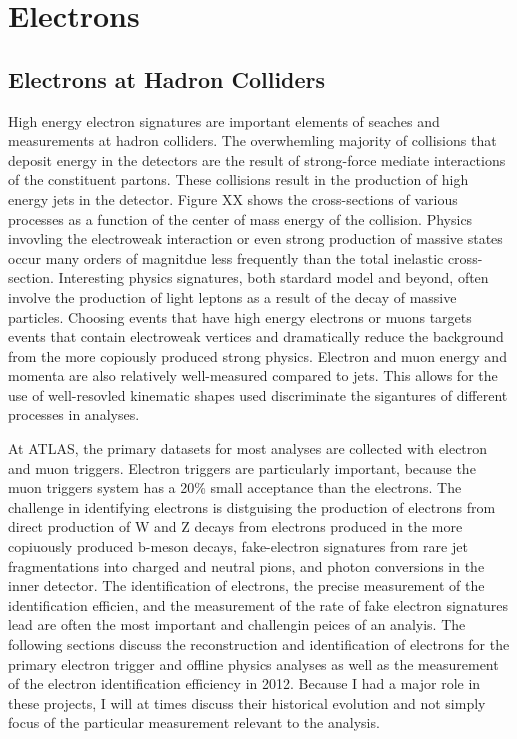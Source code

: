\chapter[Electrons][Electrons]{Electrons}



\section{Electrons at Hadron Colliders}

High energy electron signatures are important elements of seaches and measurements at hadron colliders. The overwhemling majority of collisions that deposit energy in the detectors are the result of strong-force mediate interactions of the constituent partons. These collisions result in the production of high energy jets in the detector. Figure XX shows the cross-sections of various processes as a function of the center of mass energy of the collision. Physics invovling the electroweak interaction or even strong production of massive states occur many orders of magnitdue less frequently than the total inelastic cross-section. 
Interesting physics signatures, both stardard model and beyond, often involve the production of light leptons as a result of the decay of massive particles. Choosing events that have high energy electrons or muons targets events that contain electroweak vertices and dramatically reduce the background from the more copiously produced strong physics. Electron and muon energy and momenta are also relatively well-measured compared to jets. This allows for the use of well-resovled kinematic shapes used discriminate the sigantures of different processes in analyses. 

At ATLAS, the primary datasets for most analyses are collected with electron and muon triggers. Electron triggers are particularly important, because the muon triggers system has a 20\% small acceptance than the electrons. The challenge in identifying electrons is distguising the production of electrons from direct production of W and Z decays from electrons produced in the more copiuously produced b-meson decays, fake-electron signatures from rare jet fragmentations into charged and neutral pions, and photon conversions in the inner detector. The identification of electrons, the precise measurement of the identification efficien, and the measurement of the rate of fake electron signatures lead are often the most important and challengin peices of an analyis. The following sections discuss the reconstruction and identification of electrons for the primary electron trigger and offline physics analyses as well as the measurement of the electron identification efficiency in 2012. Because I had a major role in these projects, I will at times discuss their historical evolution and not simply focus of the particular measurement relevant to the \tth analysis.  



